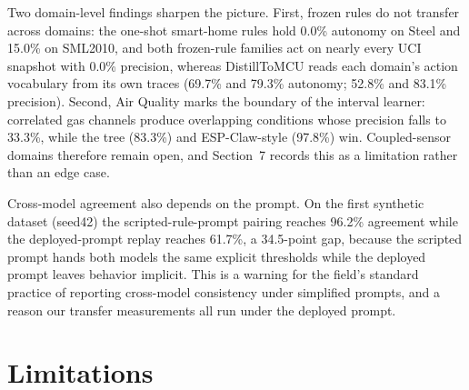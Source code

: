 \documentclass[11pt,a4paper]{article}
\begin{document}
Two domain-level findings sharpen the picture. First, frozen rules do not
transfer across domains: the one-shot smart-home rules hold 0.0\% autonomy on
Steel and 15.0\% on SML2010, and both frozen-rule families act on nearly
every UCI snapshot with 0.0\% precision, whereas DistillToMCU reads each
domain's action vocabulary from its own traces (69.7\% and 79.3\% autonomy;
52.8\% and 83.1\% precision). Second, Air Quality marks the boundary of the
interval learner: correlated gas channels produce overlapping conditions
whose precision falls to 33.3\%, while the tree (83.3\%) and ESP-Claw-style
(97.8\%) win. Coupled-sensor domains therefore remain open, and Section~7
records this as a limitation rather than an edge case.

Cross-model agreement also depends on the prompt. On the first synthetic
dataset (seed42) the scripted-rule-prompt pairing reaches
96.2\% agreement while the deployed-prompt replay reaches 61.7\%, a 34.5-point
gap, because the scripted prompt hands both models the same explicit
thresholds while the deployed prompt leaves behavior implicit. This is a
warning for the field's standard practice of reporting cross-model
consistency under simplified prompts, and a reason our transfer measurements
all run under the deployed prompt.

\section{Limitations}
\end{document}
